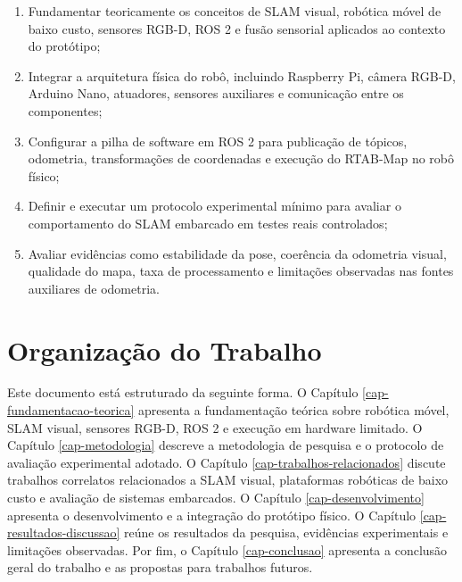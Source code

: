\begin{enumerate}
    \item Fundamentar teoricamente os conceitos de SLAM visual, robótica móvel de baixo custo, sensores RGB-D, ROS 2 e fusão sensorial aplicados ao contexto do protótipo;
    \item Integrar a arquitetura física do robô, incluindo Raspberry Pi, câmera RGB-D, Arduino Nano, atuadores, sensores auxiliares e comunicação entre os componentes;
    \item Configurar a pilha de software em ROS 2 para publicação de tópicos, odometria, transformações de coordenadas e execução do RTAB-Map no robô físico;
    \item Definir e executar um protocolo experimental mínimo para avaliar o comportamento do SLAM embarcado em testes reais controlados;
    \item Avaliar evidências como estabilidade da pose, coerência da odometria visual, qualidade do mapa, taxa de processamento e limitações observadas nas fontes auxiliares de odometria.
\end{enumerate}

\section{Organização do Trabalho}

Este documento está estruturado da seguinte forma. O Capítulo \ref{cap-fundamentacao-teorica} apresenta a fundamentação teórica sobre robótica móvel, SLAM visual, sensores RGB-D, ROS 2 e execução em hardware limitado. O Capítulo \ref{cap-metodologia} descreve a metodologia de pesquisa e o protocolo de avaliação experimental adotado. O Capítulo \ref{cap-trabalhos-relacionados} discute trabalhos correlatos relacionados a SLAM visual, plataformas robóticas de baixo custo e avaliação de sistemas embarcados. O Capítulo \ref{cap-desenvolvimento} apresenta o desenvolvimento e a integração do protótipo físico. O Capítulo \ref{cap-resultados-discussao} reúne os resultados da pesquisa, evidências experimentais e limitações observadas. Por fim, o Capítulo \ref{cap-conclusao} apresenta a conclusão geral do trabalho e as propostas para trabalhos futuros.
